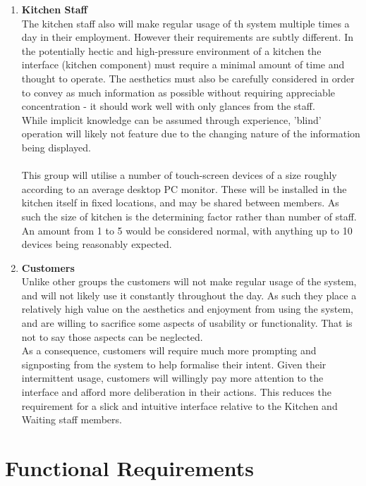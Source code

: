 \documentclass[11pt, a4paper]{report}
\begin{document}
\begin{enumerate}
\item \textbf{Kitchen Staff}\\
The kitchen staff also will make regular usage of th system multiple times a day in their employment. However their requirements are subtly different. In the potentially hectic and high-pressure environment of a kitchen the interface (kitchen component) must require a minimal amount of time and thought to operate. The aesthetics must also be carefully considered in order to convey as much information as possible without requiring appreciable concentration - it should work well with only glances from the staff.\\
While implicit knowledge can be assumed through experience, 'blind' operation will likely not feature due to the changing nature of the information being displayed.\\ 
\\
This group will utilise a number of touch-screen devices of a size roughly according to an average desktop PC monitor. These will be installed in the kitchen itself in fixed locations, and may be shared between members. As such the size of kitchen is the determining factor rather than number of staff. An amount from 1 to 5 would be considered normal, with anything up to 10 devices being reasonably expected.


\item \textbf{Customers}\\
Unlike other groups the customers will not make regular usage of the system, and will not likely use it constantly throughout the day. As such they place a relatively high value on the aesthetics and enjoyment from using the system, and are willing to sacrifice some aspects of usability or functionality. That is not to say those aspects can be neglected.\\
As a consequence, customers will require much more prompting and signposting from the system to help formalise their intent. Given their intermittent usage, customers will willingly pay more attention to the interface and afford more deliberation in their actions. This reduces the requirement for a slick and intuitive interface relative to the Kitchen and Waiting staff members.
\end{enumerate}

\section{Functional Requirements} \label{sec:Functional}
\end{document}
